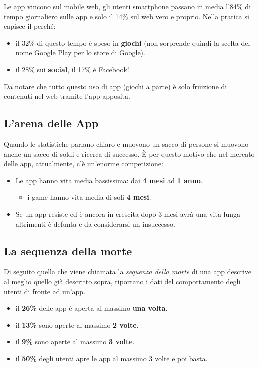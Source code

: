 			Le app vincono sul mobile web, gli utenti smartphone passano in media l'84\% di tempo giornaliero sulle app e solo il 14\% sul web vero e proprio. Nella pratica si capisce il perché:
			\begin{itemize}
				\item il 32\% di questo tempo è speso in \textbf{giochi} (non sorprende quindi la scelta del nome Google Play per lo store di Google).
				\item il 28\% sui \textbf{social}, il 17\% è Facebook!
			\end{itemize}
			Da notare che tutto questo uso di app (giochi a parte) è solo fruizione di contenuti nel web tramite l'app apposita.
			
		\subsection{L'arena delle App}
			Quando le statistiche parlano chiaro e muovono un sacco di persone si muovono anche un sacco di soldi e ricerca di successo. È per questo motivo che nel mercato delle app, attualmente, c'è un'enorme competizione:
			\begin{itemize}
				\item Le app hanno vita media bassissima: dai \textbf{4 mesi} ad \textbf{1 anno}.
					\begin{itemize}
						\item i game hanno vita media di soli \textbf{4 mesi}.
					\end{itemize}
				\item Se un app resiste ed è ancora in crescita dopo 3 mesi avrà una vita lunga altrimenti è defunta e da considerarsi un insuccesso.
			\end{itemize}
			
			\subsection{La sequenza della morte}
				Di seguito quella che viene chiamata la \emph{sequenza della morte} di una app descrive al meglio quello già descritto sopra, riportano i dati del comportamento degli utenti di fronte ad un'app.
				\begin{itemize}
					\item il \textbf{26\%} delle app è aperta al massimo \textbf{una volta}.
					\item il \textbf{13\%} sono aperte al massimo \textbf{2 volte}.
					\item il \textbf{9\%} sono aperte al massimo \textbf{3 volte}.
					\item il \textbf{50\%} degli utenti apre le app al massimo 3 volte e poi basta.
				\end{itemize}
		
